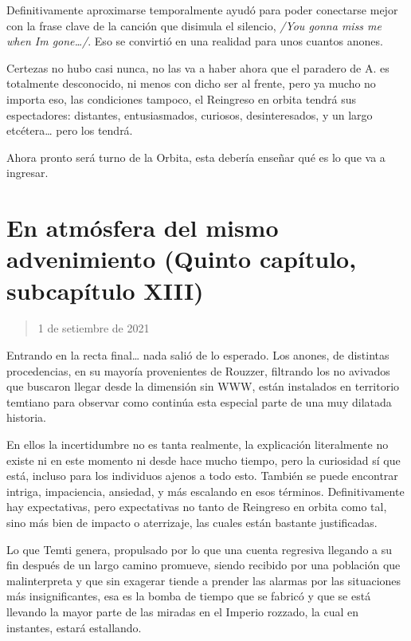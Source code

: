 \documentclass[
  spanish,
]{book}
\begin{document}
Definitivamente aproximarse temporalmente ayudó para poder conectarse mejor con la frase clave de la canción que disimula el silencio, \emph{/You gonna miss me when Im gone\ldots/}. Eso se convirtió en una realidad para unos cuantos anones.

Certezas no hubo casi nunca, no las va a haber ahora que el paradero de A. es totalmente desconocido, ni menos con dicho ser al frente, pero ya mucho no importa eso, las condiciones tampoco, el Reingreso en orbita tendrá sus espectadores: distantes, entusiasmados, curiosos, desinteresados, y un largo etcétera\ldots{} pero los tendrá.

Ahora pronto será turno de la Orbita, esta debería enseñar qué es lo que va a ingresar.

\hypertarget{en-atmuxf3sfera-del-mismo-advenimiento-quinto-capuxedtulo-subcapuxedtulo-xiii}{%
\section{En atmósfera del mismo advenimiento (Quinto capítulo, subcapítulo XIII)}\label{en-atmuxf3sfera-del-mismo-advenimiento-quinto-capuxedtulo-subcapuxedtulo-xiii}}

\begin{quote}
1 de setiembre de 2021
\end{quote}

Entrando en la recta final\ldots{} nada salió de lo esperado. Los anones, de distintas procedencias, en su mayoría provenientes de Rouzzer, filtrando los no avivados que buscaron llegar desde la dimensión sin WWW, están instalados en territorio temtiano para observar como continúa esta especial parte de una muy dilatada historia.

En ellos la incertidumbre no es tanta realmente, la explicación literalmente no existe ni en este momento ni desde hace mucho tiempo, pero la curiosidad sí que está, incluso para los individuos ajenos a todo esto. También se puede encontrar intriga, impaciencia, ansiedad, y más escalando en esos términos. Definitivamente hay expectativas, pero expectativas no tanto de Reingreso en orbita como tal, sino más bien de impacto o aterrizaje, las cuales están bastante justificadas.

Lo que Temti genera, propulsado por lo que una cuenta regresiva llegando a su fin después de un largo camino promueve, siendo recibido por una población que malinterpreta y que sin exagerar tiende a prender las alarmas por las situaciones más insignificantes, esa es la bomba de tiempo que se fabricó y que se está llevando la mayor parte de las miradas en el Imperio rozzado, la cual en instantes, estará estallando.
\end{document}
